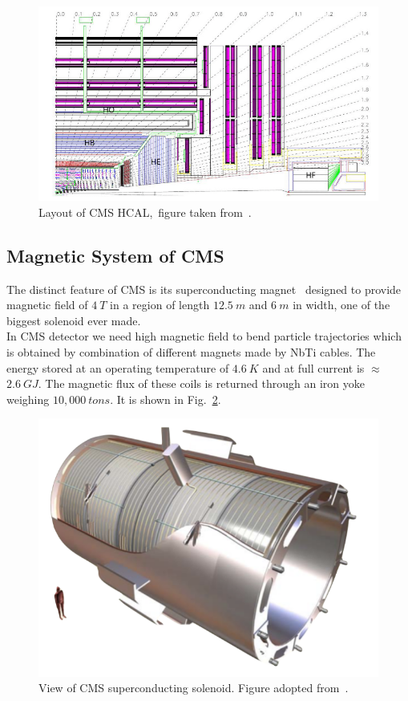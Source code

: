 \begin{figure}[H]
\centering
\includegraphics[scale=0.5]{chapter2/Hcal1.png}
\caption{Layout of CMS HCAL,~figure taken from~\cite{Collaboration_2008cms}.}
\label{hcal1}
\end{figure}

\subsection{Magnetic System of CMS}
The distinct feature of CMS is its superconducting magnet~\cite{Klyukhin:2773274} designed to provide magnetic field of $4~T$ in a region of length $12.5~m$ and $6~m$ in width, one of the biggest solenoid ever made.\\
In CMS detector we need high magnetic field to bend particle trajectories which is obtained by combination of different magnets made by NbTi cables. The energy stored at an operating temperature of $4.6~K$ and at full current is $\approx$ ~$2.6~GJ$. The magnetic flux of these coils is returned through an iron yoke weighing $10,000~tons$. It is shown in Fig.~\ref{CMS_magnet}. 

\begin{figure}[H]
\centering
\includegraphics[scale=0.5]{chapter2/magnetic-cms.png}
\caption{View of CMS superconducting solenoid. Figure adopted from~\cite{Collaboration_2008cms}.}
\label{CMS_magnet}
\end{figure} 

